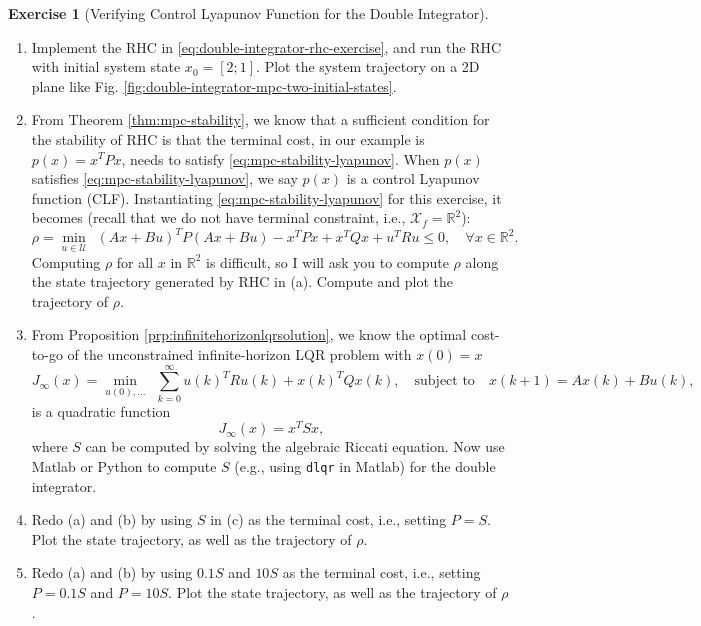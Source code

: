 \documentclass[
]{book}
\theoremstyle{definition}
\theoremstyle{definition}
\theoremstyle{definition}
\newtheorem{exercise}{Exercise}[chapter]
\theoremstyle{definition}
\theoremstyle{remark}
\begin{document}
\begin{exercise}[Verifying Control Lyapunov Function for the  Double Integrator]
\begin{enumerate}
\def\labelenumi{\alph{enumi}.}
\item
  Implement the RHC in \eqref{eq:double-integrator-rhc-exercise}, and run the RHC with initial system state \(x_0 = [2;1]\). Plot the system trajectory on a 2D plane like Fig. \ref{fig:double-integrator-mpc-two-initial-states}.
\item
  From Theorem \ref{thm:mpc-stability}, we know that a sufficient condition for the stability of RHC is that the terminal cost, in our example is \(p(x) = x^T P x\), needs to satisfy \eqref{eq:mpc-stability-lyapunov}. When \(p(x)\) satisfies \eqref{eq:mpc-stability-lyapunov}, we say \(p(x)\) is a control Lyapunov function (CLF). Instantiating \eqref{eq:mpc-stability-lyapunov} for this exercise, it becomes (recall that we do not have terminal constraint, i.e., \(\mathcal{X}_f = \mathbb{R}^2\)):
  \begin{equation}
  \rho = \min_{u \in \mathcal{U}} \ \ (Ax + Bu)^T P (Ax + Bu) - x^T P x + x^T Q x + u^T R u \leq 0, \quad \forall x \in \mathbb{R}^2.
  \label{eq:clf-double-integrator}
  \end{equation}
  Computing \(\rho\) for all \(x\) in \(\mathbb{R}^2\) is difficult, so I will ask you to compute \(\rho\) along the state trajectory generated by RHC in (a). Compute and plot the trajectory of \(\rho\).
\item
  From Proposition \ref{prp:infinitehorizonlqrsolution}, we know the optimal cost-to-go of the unconstrained infinite-horizon LQR problem with \(x(0) = x\)
  \[
  J_{\infty}(x) = \min_{u(0),\dots} \ \ \sum_{k=0}^{\infty} u(k)^T R u(k) + x(k)^T Q x(k), \quad \text{subject to} \quad x(k+1) = A x(k) + B u(k), 
  \]
  is a quadratic function
  \[
  J_{\infty}(x) = x^T S x,
  \]
  where \(S\) can be computed by solving the algebraic Riccati equation. Now use Matlab or Python to compute \(S\) (e.g., using \texttt{dlqr} in Matlab) for the double integrator.
\item
  Redo (a) and (b) by using \(S\) in (c) as the terminal cost, i.e., setting \(P=S\). Plot the state trajectory, as well as the trajectory of \(\rho\).
\item
  Redo (a) and (b) by using \(0.1S\) and \(10S\) as the terminal cost, i.e., setting \(P=0.1S\) and \(P=10S\). Plot the state trajectory, as well as the trajectory of \(\rho\).
\end{enumerate}

\end{exercise}
\end{document}

